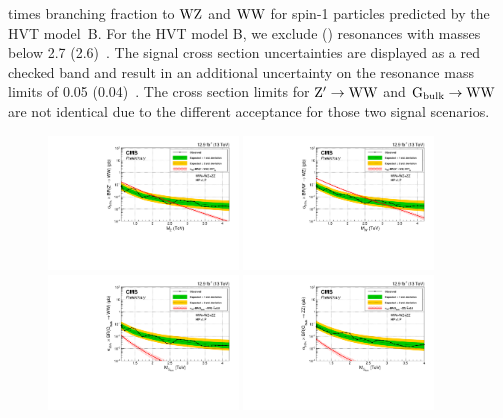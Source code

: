times branching fraction to $\mathrm{W}\mathrm{Z}$ and $\mathrm{W}\mathrm{W}$ for spin-1 particles predicted by the HVT model~B. For the HVT model B, we exclude \PWpr (\PZpr) resonances with masses below 2.7 (2.6)~\TeV. The signal cross section uncertainties are displayed as a red checked band and result in an additional uncertainty on the resonance mass limits of 0.05 (0.04)~\TeV.
The cross section limits for $\mathrm{Z}^\prime \rightarrow \mathrm{W}\mathrm{W}$ and $\rm G_{bulk}\rightarrow\mathrm{W}\mathrm{W}$ are not identical due to the different acceptance for those two signal scenarios.
\begin{figure}[h!]
\centering
     \includegraphics[width=0.45\textwidth]{figures/analysis/search2/B2G-16-021/figures/limits/brazilianFlag_ZprimeWW_new_combined_13TeV.pdf}
     \includegraphics[width=0.45\textwidth]{figures/analysis/search2/B2G-16-021/figures/limits/brazilianFlag_WZ_new_combined_13TeV.pdf}\\
     \includegraphics[width=0.45\textwidth]{figures/analysis/search2/B2G-16-021/figures/limits/brazilianFlag_BulkWW_new_combined_13TeV.pdf}
     \includegraphics[width=0.45\textwidth]{figures/analysis/search2/B2G-16-021/figures/limits/brazilianFlag_BulkZZ_new_combined_13TeV.pdf}

\end{figure}
